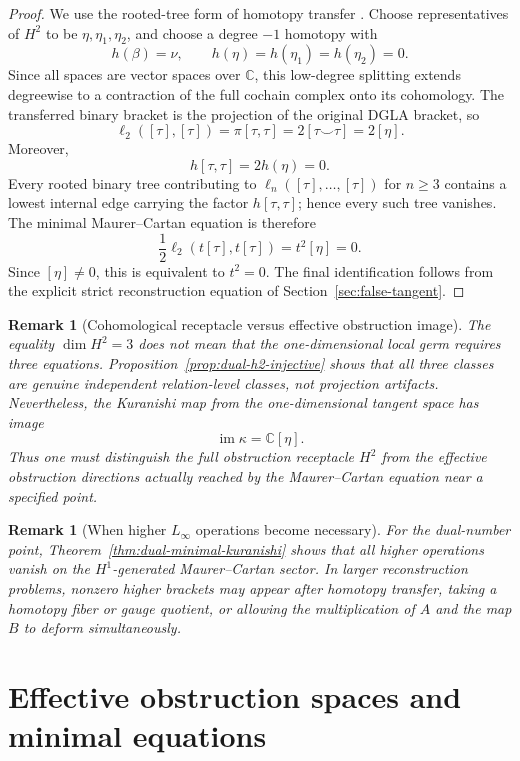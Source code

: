 \documentclass[11pt]{amsart}
\newtheorem{remark}[theorem]{Remark}
\newcommand{\C}{\mathbb C}
\begin{document}
\begin{proof}
We use the rooted-tree form of homotopy transfer
\cite[Chapter~10]{LodayVallette2012}. Choose representatives of $H^2$ to be
$\eta,\eta_1,\eta_2$, and choose a degree $-1$ homotopy with
\[
h(\beta)=\nu,
\qquad
h(\eta)=h(\eta_1)=h(\eta_2)=0.
\]
Since all spaces are vector spaces over $\C$, this low-degree splitting extends degreewise to a contraction of the full cochain complex onto its cohomology.  The transferred binary bracket is the projection of the original DGLA bracket, so
\[
\ell_2([\tau],[\tau])
=\pi[\tau,\tau]
=2[\tau\smile\tau]
=2[\eta].
\]
Moreover,
\[
h[\tau,\tau]=2h(\eta)=0.
\]
Every rooted binary tree contributing to $\ell_n([\tau],\ldots,[\tau])$ for $n\ge3$ contains a lowest internal edge carrying the factor $h[\tau,\tau]$; hence every such tree vanishes.  The minimal Maurer--Cartan equation is therefore
\[
\frac12\ell_2(t[\tau],t[\tau])=t^2[\eta]=0.
\]
Since $[\eta]\neq0$, this is equivalent to $t^2=0$.  The final identification follows from the explicit strict reconstruction equation of Section~\ref{sec:false-tangent}.
\end{proof}

\begin{remark}[Cohomological receptacle versus effective obstruction image]
The equality $\dim H^2=3$ does not mean that the one-dimensional local germ requires three equations.  Proposition~\ref{prop:dual-h2-injective} shows that all three classes are genuine independent relation-level classes, not projection artifacts.  Nevertheless, the Kuranishi map from the one-dimensional tangent space has image
\[
\operatorname{im}\kappa=\C[\eta].
\]
Thus one must distinguish the full obstruction receptacle $H^2$ from the effective obstruction directions actually reached by the Maurer--Cartan equation near a specified point.
\end{remark}

\begin{remark}[When higher $L_\infty$ operations become necessary]
For the dual-number point, Theorem~\ref{thm:dual-minimal-kuranishi} shows that all higher operations vanish on the $H^1$-generated Maurer--Cartan sector.  In larger reconstruction problems, nonzero higher brackets may appear after homotopy transfer, taking a homotopy fiber or gauge quotient, or allowing the multiplication of $A$ and the map $B$ to deform simultaneously.
\end{remark}


\section{Effective obstruction spaces and minimal equations}\label{sec:effective-obstruction}
\end{document}
